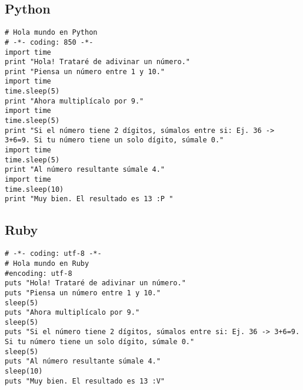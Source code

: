 \documentclass[10pt]{article}
\begin{document}
\subsection{Python}
\begin{verbatim}
# Hola mundo en Python
# -*- coding: 850 -*-
import time
print "Hola! Trataré de adivinar un número."
print "Piensa un número entre 1 y 10."
import time
time.sleep(5)
print "Ahora multiplícalo por 9."
import time
time.sleep(5)
print "Si el número tiene 2 dígitos, súmalos entre si: Ej. 36 -> 3+6=9. Si tu número tiene un solo dígito, súmale 0."
import time
time.sleep(5)
print "Al número resultante súmale 4."
import time
time.sleep(10)
print "Muy bien. El resultado es 13 :P "
\end{verbatim}

\subsection{Ruby}
\begin{verbatim}
# -*- coding: utf-8 -*-
# Hola mundo en Ruby
#encoding: utf-8
puts "Hola! Trataré de adivinar un número."
puts "Piensa un número entre 1 y 10."
sleep(5)
puts "Ahora multiplícalo por 9."
sleep(5)
puts "Si el número tiene 2 dígitos, súmalos entre si: Ej. 36 -> 3+6=9. Si tu número tiene un solo dígito, súmale 0."
sleep(5)
puts "Al número resultante súmale 4."
sleep(10)
puts "Muy bien. El resultado es 13 :V"
\end{verbatim}
 
\end{document}

